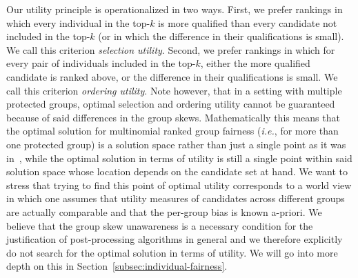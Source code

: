 Our utility principle is operationalized in two ways.
%
First, we prefer rankings in which every individual in the top-$k$ is more qualified than every candidate not included in the top-$k$ (or in which the difference in their qualifications is small). We call this criterion \emph{selection utility}.
%
Second, we prefer rankings in which for every pair of individuals included in the top-$k$, either the more qualified candidate is ranked above, or the difference in their qualifications is small. We call this criterion \emph{ordering utility}.
%
Note however, that in a setting with multiple protected groups, optimal selection and ordering utility cannot be guaranteed because of said differences in the group skews.
%
Mathematically this means that the optimal solution for multinomial ranked group fairness ({\em i.e.}, for more than one protected group) is a solution space rather than just a single point as it was in~\cite{zehlike2017fair}, while the optimal solution in terms of utility is still a single point within said solution space whose location depends on the candidate set at hand.
%
We want to stress that trying to find this point of optimal utility corresponds to a world view in which one assumes that utility measures of candidates across different groups are actually comparable and that the per-group bias is known a-priori.
%
We believe that the group skew unawareness is a necessary condition for the justification of post-processing algorithms in general and we therefore explicitly do not search for the optimal solution in terms of utility.
%
We will go into more depth on this in Section~\ref{subsec:individual-fairness}.
%

